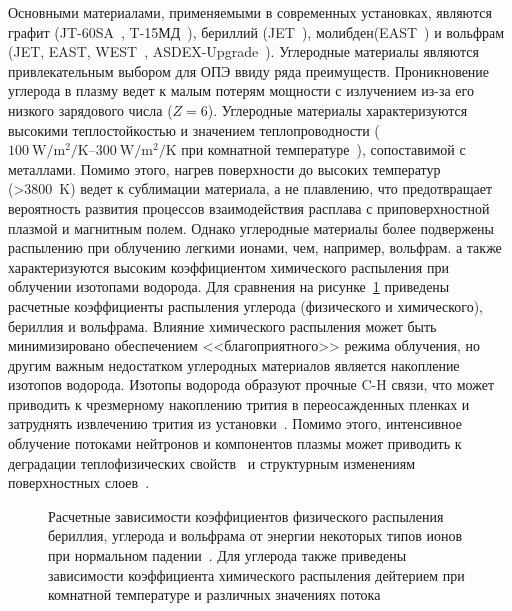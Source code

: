 Основными материалами, применяемыми в современных установках, являются графит (JT-60SA~\cite{Shirai2024}, T-15МД~\cite{Velikhov2024}), бериллий (JET~\cite{Maggi2024,Kappatou2025}), молибден(EAST~\cite{Gong2024}) и вольфрам (JET, EAST, WEST~\cite{Shi2025}, ASDEX-Upgrade~\cite{Rohde2009}). Углеродные материалы являются привлекательным выбором для ОПЭ ввиду ряда преимуществ. Проникновение углерода в плазму ведет к малым потерям мощности с излучением из-за его низкого зарядового числа ($Z=6$). Углеродные материалы характеризуются высокими теплостойкостью и значением теплопроводности ($\SIrange{100}{300}{\watt\per\meter\squared\per\kelvin}$ при комнатной температуре~\cite{Merola2004, Begrambekov2023}), сопоставимой с металлами. Помимо этого, нагрев поверхности до высоких температур (>\SI{3800}{\kelvin}) ведет к сублимации материала, а не плавлению, что предотвращает вероятность развития процессов взаимодействия расплава с приповерхностной плазмой и магнитным полем. Однако углеродные материалы более подвержены распылению при облучению легкими ионами, чем, например, вольфрам. а также характеризуются высоким коэффициентом химического распыления при облучении изотопами водорода. Для сравнения на рисунке~\cref{fig:ch1/sputerring_yields} приведены расчетные коэффициенты распыления углерода (физического и химического), бериллия и вольфрама. Влияние химического распыления может быть минимизировано обеспечением <<благоприятного>> режима облучения, но другим важным недостатком углеродных материалов является накопление изотопов водорода. Изотопы водорода образуют прочные C-H связи, что может приводить к чрезмерному накоплению трития в переосажденных пленках и затруднять извлечению трития из установки~\cite{Gasparyan2024}. Помимо этого, интенсивное облучение потоками нейтронов и компонентов плазмы может приводить к деградации теплофизических свойств~\cite{Wu1994} и структурным изменениям поверхностных слоев~\cite{Wang2018,Begrambekov2019,Seyedhabashi2025}.

\begin{figure}[ht]
    \caption{Расчетные зависимости коэффициентов физического распыления бериллия, углерода и вольфрама от энергии некоторых типов ионов при нормальном падении~\cite{international2001iaea, behrisch_2025}. Для углерода также приведены зависимости коэффициента химического распыления дейтерием при комнатной температуре и различных значениях потока~\cite{Roth1999,Roth2004}}\label{fig:ch1/sputerring_yields}
\end{figure}

